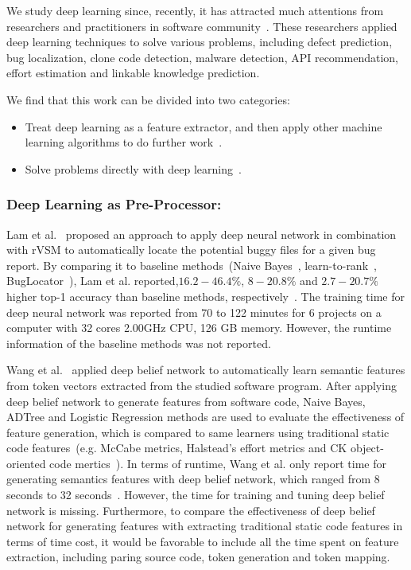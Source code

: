 \documentclass[sigconf,review, anonymous]{acmart}
\theoremstyle{break}
\newcommand{\bi}{\begin{itemize}[leftmargin=0.4cm]}
\newcommand{\ei}{\end{itemize}}
\begin{document}
We study deep learning since, recently, it  has attracted 
much attentions from researchers and practitioners in software
 community~\cite{wang2016automatically, gu2016deep, xu2016predicting,white2016deep,white2015toward,lam2015combining,choetkiertikul2016deep,yuan2014droid,mou2016convolutional}.
 These researchers applied  deep learning techniques to solve various problems,
 including defect prediction, bug localization, clone code detection, malware detection, API recommendation, 
 effort estimation and linkable knowledge prediction.
 
We find that this work   can be divided into   two categories:
 
\bi
\item Treat deep learning as a feature extractor, and then apply other  machine learning algorithms to do further work~\cite{lam2015combining,wang2016automatically,choetkiertikul2016deep}.
\item Solve problems directly with  deep learning~\cite{gu2016deep,xu2016predicting,white2016deep,white2015toward,yuan2014droid,mou2016convolutional}.
\ei
\noindent
\subsubsection{Deep Learning as  Pre-Processor:}

Lam et al.~\cite{lam2015combining}  proposed an approach to apply deep neural network
 in combination with rVSM to automatically locate the potential buggy files for a given
 bug report. By comparing it to baseline methods~(Naive Bayes~\cite{kim2013should}, learn-to-rank~\cite{ye2014learning}, 
 BugLocator~\cite{zhou2012should}), Lam et al. reported,$16.2-46.4\%$, $8-20.8\%$  and $2.7-20.7\%$ 
 higher top-1 accuracy than baseline methods, respectively~\cite{lam2015combining}. The training time for deep neural
 network was reported from 70 to 122 minutes for 6 projects on a computer with 32 cores 2.00GHz CPU,
 126 GB memory. However,
 the runtime information of the baseline methods was not reported.
 
 Wang et al.~\cite{wang2016automatically} applied deep belief network to automatically
 learn semantic features from token vectors extracted from the studied software program. After
 applying deep belief network to generate features from software code,
 Naive Bayes, ADTree and Logistic Regression methods are used to evaluate the effectiveness
 of feature generation, which is compared to same learners using traditional 
 static code features~(e.g.  McCabe metrics, Halstead's effort metrics and  CK object-oriented code mertics~\cite{kafura1987use,chidamber1994metrics,mccabe1976complexity,halstead1977elements}). In terms of
 runtime, Wang et al. only report time for generating semantics features with deep belief network, which
 ranged from 8 seconds to 32 seconds~\cite{wang2016automatically}. However, the time for training and tuning deep belief network is
 missing. Furthermore, to compare the effectiveness of deep belief network for generating features with extracting traditional 
 static code features in terms of time cost, 
 it would be favorable to include all the time spent on feature extraction, including
 paring source code, token generation and token mapping.
 
\end{document}
